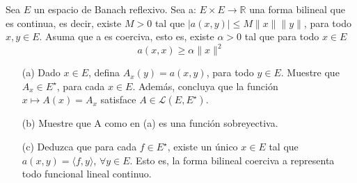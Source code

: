   Sea $E$ un espacio de Banach reflexivo. Sea a: $E \times E \rightarrow \mathbb{R}$ una forma bilineal que es continua, es decir, existe $M>0$ tal que $|a(x, y)| \leq M\|x\|\|y\|$, para todo $x, y \in E$. Asuma que a es coerciva, esto es, existe $\alpha>0$ tal que para todo $x \in E$
$$
a(x, x) \geq \alpha\|x\|^2
$$
\begin{itemize}
    \item[(a)]Dado $x \in E$, defina $A_x(y)=a(x, y)$, para todo $y \in E$. Muestre que $A_x \in E^{\star}$, para cada $x \in E$. Además, concluya que la función $x \mapsto A(x)=A_x$ satisface $A \in \mathcal{L}\left(E, E^{\star}\right)$. 
    \item[(b)] Muestre que A como en (a) es una función sobreyectiva.
    \item[(c)] Deduzca que para cada $f \in E^{\star}$, existe un único $x \in E$ tal que $a(x, y)=\langle f, y\rangle$, $\forall y \in E$. Esto es, la forma bilineal coerciva a representa todo funcional lineal continuo.
\end{itemize}
